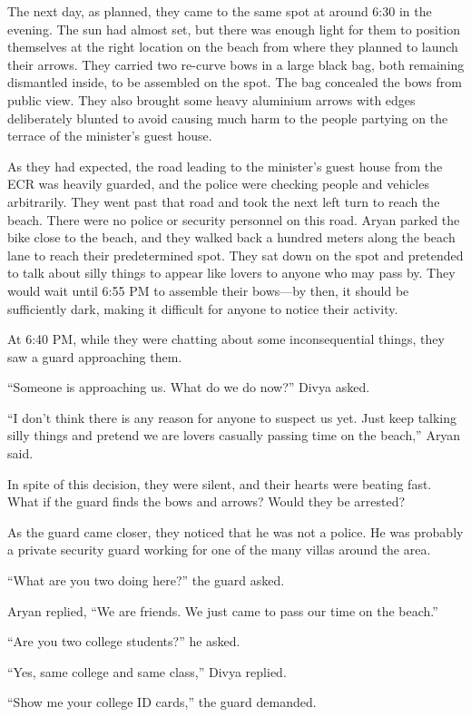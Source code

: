 The next day, as planned, they came to the same spot at around 6:30 in the evening.
The sun had almost set, but there was enough light for them to position
themselves at the right location on the beach from where they planned to launch
their arrows. They carried two re-curve bows in a large black bag, both remaining
dismantled inside, to be assembled on the spot. The bag concealed the bows
from public view. They also brought some heavy aluminium arrows with
edges deliberately blunted to avoid causing much harm to the people
partying on the terrace of the minister's guest house.

As they had expected, the road leading to the minister's guest house from the
ECR was heavily guarded, and the police were checking people and vehicles
arbitrarily. They went past that road and took the next left turn to reach the
beach. There were no police or security personnel on this road. Aryan parked the bike close
to the beach, and they walked back a hundred meters along the beach lane to reach
their predetermined spot. They sat down on the spot and pretended to talk about
silly things to appear like lovers to anyone who may pass by. They would
wait until 6:55 PM to assemble their bows—by then, it should be
sufficiently dark, making it difficult for anyone to notice their activity.

At 6:40 PM, while they were chatting about some inconsequential things, they saw
a guard approaching them.

“Someone is approaching us. What do we do now?” Divya asked.

“I don't think there is any reason for anyone to suspect us yet. Just keep
talking silly things and pretend we are lovers casually passing time on
the beach,” Aryan said.

In spite of this decision, they were silent, and their hearts were beating fast.
What if the guard finds the bows and arrows? Would they be arrested?

As the guard came closer, they noticed that he was not a police. He was probably
a private security guard working for one of the many villas around the area.

“What are you two doing here?” the guard asked.

Aryan replied, “We are friends. We just came to pass our time on the beach.”

“Are you two college students?” he asked.

“Yes, same college and same class,” Divya replied.

“Show me your college ID cards,” the guard demanded.

